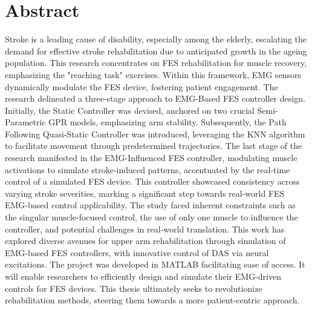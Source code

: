 \section*{Abstract}
Stroke is a leading cause of disability, especially among the elderly, escalating the demand for effective stroke rehabilitation due to anticipated growth in the ageing population. This research concentrates on \ac{FES} rehabilitation for muscle recovery, emphasizing the "reaching task" exercises. Within this framework, \ac{EMG} sensors dynamically modulate the \ac{FES} device, fostering patient engagement. The research delineated a three-stage approach to EMG-Based FES controller design. Initially, the Static Controller was devised, anchored on two crucial Semi-Parametric \ac{GPR} models, emphasizing arm stability. Subsequently, the Path Following Quasi-Static Controller was introduced, leveraging the \ac{KNN} algorithm to facilitate movement through predetermined trajectories. The last stage of the research manifested in the \ac{EMG}-Influenced \ac{FES} controller, modulating muscle activations to simulate stroke-induced patterns, accentuated by the real-time control of a simulated \ac{FES} device. This controller showcased consistency across varying stroke severities, marking a significant step towards real-world \ac{FES} \ac{EMG}-based control applicability. The study faced inherent constraints such as the singular muscle-focused control, the use of only one muscle to influence the controller, and potential challenges in real-world translation. This work has explored diverse avenues for upper arm rehabilitation through simulation of \ac{EMG}-based \ac{FES} controllers, with innovative control of \ac{DAS} via neural excitations. The project was developed in MATLAB facilitating ease of access. It will enable researchers to efficiently design and simulate their EMG-driven controls for \ac{FES} devices. This thesis ultimately seeks to revolutionize rehabilitation methods, steering them towards a more patient-centric approach.





